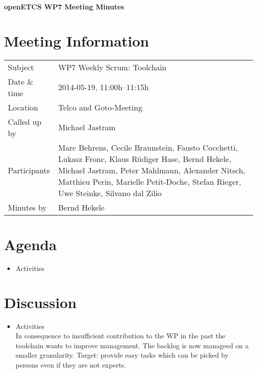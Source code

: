 \documentclass[a4paper, 11pt]{article}
\begin{document}
{\begin{center}\huge\bf openETCS WP7 Meeting Minutes\end{center}}
\section{Meeting Information}

\renewcommand{\arraystretch}{1.5}
\begin{supertabular}{m{.2\textwidth}m{.8\textwidth}}
Subject & WP7 Weekly Scrum: Toolchain\\
Date \& time & 2014-05-19, 11:00h--11:15h\\
Location & Telco and Goto-Meeting\\
Called up by & Michael Jastram\\
Participants &
Marc Behrens,
Cecile Braunstein,
Fausto Cocchetti,
Lukasz Fronc,
Klaus R\"udiger Hase,
Bernd Hekele,
Michael Jastram,
Peter Mahlmann,
Alexander Nitsch,
Matthieu Perin,
Marielle Petit-Doche,
Stefan Rieger,
Uwe Steinke,
Silvano dal Zilio
\\

Minutes by & Bernd Hekele\\

\end{supertabular}
\renewcommand{\arraystretch}{1.0}


\section{Agenda}
\begin{itemize}
\item Activities
\end{itemize}

\section{Discussion}

\begin{itemize}
\item Activities\\
In consequence to insufficient contribution to the WP in the past the toolchain wants to improve management. The backlog is now manageed on a smaller granularity. Target: provide easy tasks which can be picked by persons even if they are not experts.

\end{itemize}
\end{document}
